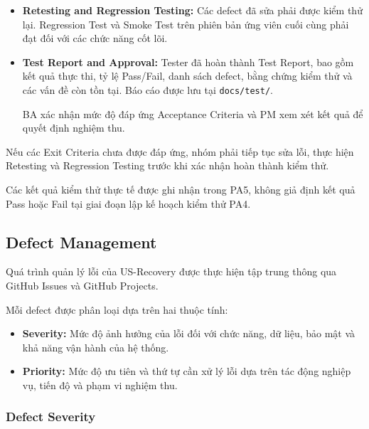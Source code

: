 \begin{itemize}
    Đối với NFR-05, hệ thống phải đạt uptime 
    $\geq 99\%$ trong tuần 10--11. Nếu thời gian 
    giám sát chưa kết thúc tại thời điểm bàn giao 
    PA5, kết quả được ghi nhận là Pending và 
    xác nhận vào cuối tuần 11.

    \item \textbf{Retesting and Regression Testing:}
    Các defect đã sửa phải được kiểm thử lại. 
    Regression Test và Smoke Test trên phiên bản 
    ứng viên cuối cùng phải đạt đối với các 
    chức năng cốt lõi.

    \item \textbf{Test Report and Approval:}
    Tester đã hoàn thành Test Report, bao gồm 
    kết quả thực thi, tỷ lệ Pass/Fail, danh sách 
    defect, bằng chứng kiểm thử và các vấn đề 
    còn tồn tại. Báo cáo được lưu tại 
    \texttt{docs/test/}.

    BA xác nhận mức độ đáp ứng Acceptance Criteria 
    và PM xem xét kết quả để quyết định nghiệm thu.
\end{itemize}

Nếu các Exit Criteria chưa được đáp ứng, nhóm phải 
tiếp tục sửa lỗi, thực hiện Retesting và Regression 
Testing trước khi xác nhận hoàn thành kiểm thử.

Các kết quả kiểm thử thực tế được ghi nhận trong PA5, 
không giả định kết quả Pass hoặc Fail tại giai đoạn 
lập kế hoạch kiểm thử PA4.


\subsection{Defect Management}

Quá trình quản lý lỗi của US-Recovery được thực hiện 
tập trung thông qua GitHub Issues và GitHub Projects.

Mỗi defect được phân loại dựa trên hai thuộc tính:

\begin{itemize}
    \item \textbf{Severity:} Mức độ ảnh hưởng của lỗi 
    đối với chức năng, dữ liệu, bảo mật và khả năng 
    vận hành của hệ thống.

    \item \textbf{Priority:} Mức độ ưu tiên và thứ tự 
    cần xử lý lỗi dựa trên tác động nghiệp vụ, 
    tiến độ và phạm vi nghiệm thu.
\end{itemize}

\subsubsection*{Defect Severity}

